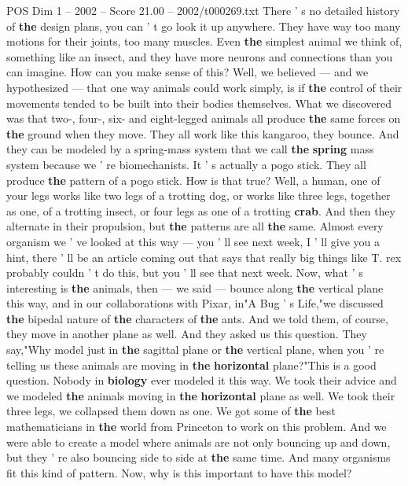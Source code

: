 \begin{textsample}{POS Dim 1 – 2002 – Score 21.00 – 2002/t000269.txt}
There ' s no detailed history of \textbf{the} design plans, you can ' t go look it up anywhere.
They have way too many motions for their joints, too many muscles.
Even \textbf{the} simplest animal we think of, something like an insect, and they have more neurons and connections than you can imagine.
How can you make sense of this?
Well, we believed — and we hypothesized — that one way animals could work simply, is if \textbf{the} control of their movements tended to be built into their bodies themselves.
What we discovered was that two-, four-, six- and eight-legged animals all produce \textbf{the} same forces on \textbf{the} ground when they move.
They all work like this kangaroo, they bounce.
And they can be modeled by a spring-mass system that we call \textbf{the} \textbf{spring} mass system because we ' re biomechanists.
It ' s actually a pogo stick.
They all produce \textbf{the} pattern of a pogo stick.
How is that true?
Well, a human, one of your legs works like two legs of a trotting dog, or works like three legs, together as one, of a trotting insect, or four legs as one of a trotting \textbf{crab}.
And then they alternate in their propulsion, but \textbf{the} patterns are all \textbf{the} same.
Almost every organism we ' ve looked at this way — you ' ll see next week, I ' ll give you a hint, there ' ll be an article coming out that says that really big things like T. rex probably couldn ' t do this, but you ' ll see that next week.
Now, what ' s interesting is \textbf{the} animals, then — we said — bounce along \textbf{the} vertical plane this way, and in our collaborations with Pixar, in"A Bug ' s Life,"we discussed \textbf{the} bipedal nature of \textbf{the} characters of \textbf{the} ants.
And we told them, of course, they move in another plane as well.
And they asked us this question.
They say,"Why model just in \textbf{the} sagittal plane or \textbf{the} vertical plane, when you ' re telling us these animals are moving in \textbf{the} \textbf{horizontal} plane?"This is a good question.
Nobody in \textbf{biology} ever modeled it this way.
We took their advice and we modeled \textbf{the} animals moving in \textbf{the} \textbf{horizontal} plane as well.
We took their three legs, we collapsed them down as one.
We got some of \textbf{the} best mathematicians in \textbf{the} world from Princeton to work on this problem.
And we were able to create a model where animals are not only bouncing up and down, but they ' re also bouncing side to side at \textbf{the} same time.
And many organisms fit this kind of pattern.
Now, why is this important to have this model?

\end{textsample}
